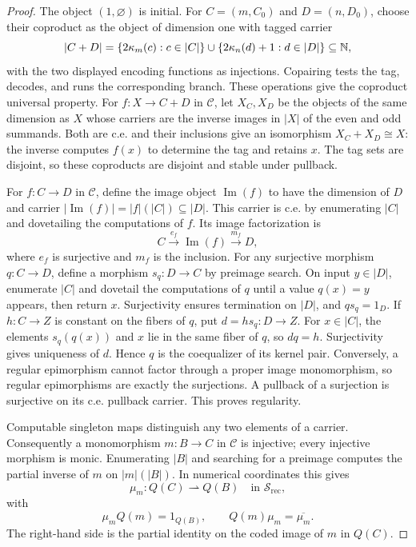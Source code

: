\begin{proof}
The object $(1,\varnothing)$ is initial. For $C=(m,C_0)$ and
$D=(n,D_0)$, choose their coproduct as the object of dimension one
with tagged carrier
\[
 |C+D|=\{2\kappa_m(c):c\in|C|\}
        \cup\{2\kappa_n(d)+1:d\in|D|\}\subseteq\mathbb N,
\]
with the two displayed encoding functions as injections.
Copairing tests the tag, decodes, and runs the corresponding
branch. These operations give the coproduct universal property.
For $f:X\to C+D$ in $\mathcal C$, let $X_C,X_D$ be the
objects of the same dimension as $X$ whose carriers are the
inverse images in $|X|$ of the even and odd summands. Both are c.e.
and their inclusions give an isomorphism $X_C+X_D\cong X$:
the inverse computes $f(x)$ to determine the tag and retains $x$.
The tag sets are disjoint, so these coproducts are disjoint and
stable under pullback.

For $f:C\to D$ in $\mathcal C$, define the image object
$\operatorname{Im}(f)$ to have the dimension of $D$ and carrier
$|\operatorname{Im}(f)|=|f|(|C|)\subseteq|D|$. This carrier is
c.e. by enumerating $|C|$ and dovetailing the computations of $f$. Its image factorization
is
\[
 C\xrightarrow{e_f}\operatorname{Im}(f)
       \xrightarrow{m_f}D,
\]
where $e_f$ is surjective and $m_f$ is the inclusion.
For any surjective morphism $q:C\to D$, define a morphism
$s_q:D\to C$ by preimage search. On input $y\in|D|$, enumerate
$|C|$ and dovetail the computations of $q$ until a value
$q(x)=y$ appears, then return $x$. Surjectivity ensures termination
on $|D|$, and $qs_q=1_D$.
If $h:C\to Z$ is constant on the fibers of $q$, put
$d=hs_q:D\to Z$. For $x\in|C|$, the elements $s_q(q(x))$ and
$x$ lie in the same fiber of $q$, so $dq=h$. Surjectivity gives
uniqueness of $d$. Hence $q$ is the coequalizer of its kernel pair.
Conversely, a regular epimorphism
cannot factor through a proper image monomorphism, so regular
epimorphisms are exactly the surjections. A pullback of a surjection
is surjective on its c.e. pullback carrier. This proves regularity.

Computable singleton maps distinguish any two elements of a carrier.
Consequently a monomorphism $m:B\to C$ in $\mathcal C$ is
injective; every injective morphism is monic. Enumerating $|B|$ and
searching for a preimage computes the partial inverse of $m$ on
$|m|(|B|)$. In numerical coordinates this gives
\[
 \mu_m:Q(C)\rightharpoonup Q(B)
       \quad\text{in }\mathscr S_{\mathrm{rec}},
\]
with
\[
 \mu_mQ(m)=1_{Q(B)},\qquad
 Q(m)\mu_m=\overline{\mu_m}.
\]
The right-hand side is the partial identity on the coded image
of $m$ in $Q(C)$.


\end{proof}
